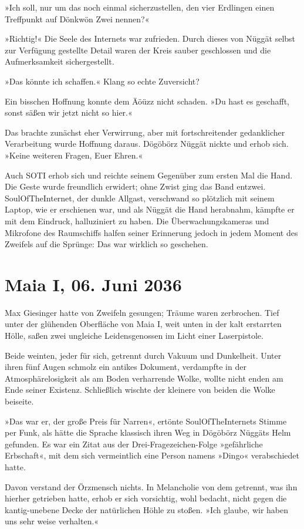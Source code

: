 »Ich soll, nur um das noch einmal sicherzustellen, den vier Erdlingen einen Treffpunkt auf Dönkwön Zwei nennen?«

»Richtig!« Die Seele des Internets war zufrieden. Durch dieses von Nüggät selbst zur Verfügung gestellte Detail waren der Kreis sauber geschlossen und die Aufmerksamkeit sichergestellt.

»Das könnte ich schaffen.« Klang so echte Zuversicht?

Ein bisschen Hoffnung konnte dem Äöüzz nicht schaden. »Du hast es geschafft, sonst säßen wir jetzt nicht so hier.«

Das brachte zunächst eher Verwirrung, aber mit fortschreitender gedanklicher Verarbeitung wurde Hoffnung daraus. Dögöbörz Nüggät nickte und erhob sich. »Keine weiteren Fragen, Euer Ehren.«

Auch SOTI erhob sich und reichte seinem Gegenüber zum ersten Mal die Hand. Die Geste wurde freundlich erwidert; ohne Zwist ging das Band entzwei. SoulOfTheInternet, der dunkle Allgast, verschwand so plötzlich mit seinem Laptop, wie er erschienen war, und als Nüggät die Hand herabnahm, kämpfte er mit dem Eindruck, halluziniert zu haben. Die Überwachungskameras und Mikrofone des Raumschiffs halfen seiner Erinnerung jedoch in jedem Moment des Zweifels auf die Sprünge: Das war wirklich so geschehen.


\chapter{Maia I, 06. Juni 2036}

Max Giesinger hatte von Zweifeln gesungen; Träume waren zerbrochen. Tief unter der glühenden Oberfläche von Maia I, weit unten in der kalt erstarrten Hölle, saßen zwei ungleiche Leidensgenossen im Licht einer Laserpistole.

Beide weinten, jeder für sich, getrennt durch Vakuum und Dunkelheit. Unter ihren fünf Augen schmolz ein antikes Dokument, verdampfte in der Atmosphärelosigkeit als am Boden verharrende Wolke, wollte nicht enden am Ende seiner Existenz. Schließlich wischte der kleinere von beiden die Wolke beiseite.

»Das war er, der große Preis für Narren«, ertönte SoulOfTheInternets Stimme per Funk, als hätte die Sprache klassisch ihren Weg in Dögöbörz Nüggäts Helm gefunden. Es war ein Zitat aus der Drei-Fragezeichen-Folge »gefährliche Erbschaft«, mit dem sich vermeintlich eine Person namens »Dingo« verabschiedet hatte.

Davon verstand der Örzmensch nichts. In Melancholie von dem getrennt, was ihn hierher getrieben hatte, erhob er sich vorsichtig, wohl bedacht, nicht gegen die kantig-unebene Decke der natürlichen Höhle zu stoßen. »Ich glaube, wir haben uns sehr weise verhalten.«

